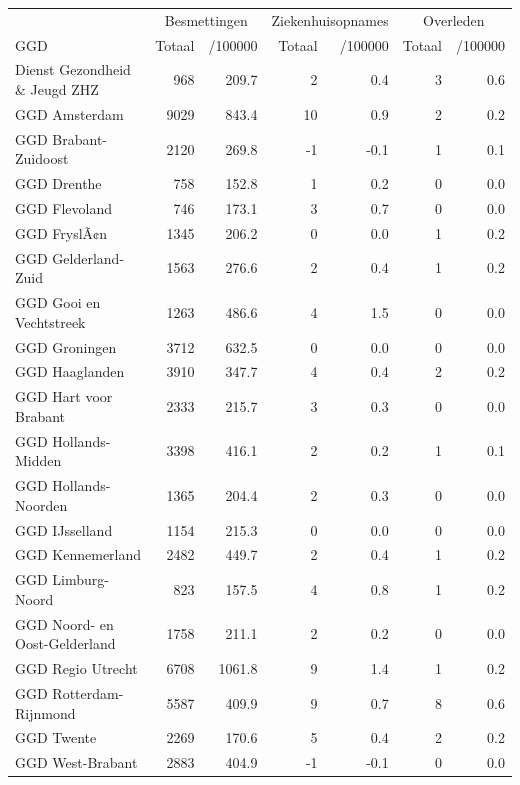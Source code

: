 \documentclass[
  english,
  man,floatsintext]{apa6}
\begin{document}
\begin{table}
\centering\begingroup\fontsize{10}{12}\selectfont

\begin{threeparttable}
\begin{tabular}{lrrrrrr}
\toprule
\multicolumn{1}{c}{ } & \multicolumn{2}{c}{Besmettingen} & \multicolumn{2}{c}{Ziekenhuisopnames} & \multicolumn{2}{c}{Overleden} \\
\cmidrule(l{3pt}r{3pt}){2-3} \cmidrule(l{3pt}r{3pt}){4-5} \cmidrule(l{3pt}r{3pt}){6-7}
GGD & Totaal & /100000 & Totaal & /100000 & Totaal & /100000\\
\midrule
Dienst Gezondheid \& Jeugd ZHZ & 968 & 209.7 & 2 & 0.4 & 3 & 0.6\\
GGD Amsterdam & 9029 & 843.4 & 10 & 0.9 & 2 & 0.2\\
GGD Brabant-Zuidoost & 2120 & 269.8 & -1 & -0.1 & 1 & 0.1\\
GGD Drenthe & 758 & 152.8 & 1 & 0.2 & 0 & 0.0\\
GGD Flevoland & 746 & 173.1 & 3 & 0.7 & 0 & 0.0\\
GGD FryslÃ¢n & 1345 & 206.2 & 0 & 0.0 & 1 & 0.2\\
GGD Gelderland-Zuid & 1563 & 276.6 & 2 & 0.4 & 1 & 0.2\\
GGD Gooi en Vechtstreek & 1263 & 486.6 & 4 & 1.5 & 0 & 0.0\\
GGD Groningen & 3712 & 632.5 & 0 & 0.0 & 0 & 0.0\\
GGD Haaglanden & 3910 & 347.7 & 4 & 0.4 & 2 & 0.2\\
GGD Hart voor Brabant & 2333 & 215.7 & 3 & 0.3 & 0 & 0.0\\
GGD Hollands-Midden & 3398 & 416.1 & 2 & 0.2 & 1 & 0.1\\
GGD Hollands-Noorden & 1365 & 204.4 & 2 & 0.3 & 0 & 0.0\\
GGD IJsselland & 1154 & 215.3 & 0 & 0.0 & 0 & 0.0\\
GGD Kennemerland & 2482 & 449.7 & 2 & 0.4 & 1 & 0.2\\
GGD Limburg-Noord & 823 & 157.5 & 4 & 0.8 & 1 & 0.2\\
GGD Noord- en Oost-Gelderland & 1758 & 211.1 & 2 & 0.2 & 0 & 0.0\\
GGD Regio Utrecht & 6708 & 1061.8 & 9 & 1.4 & 1 & 0.2\\
GGD Rotterdam-Rijnmond & 5587 & 409.9 & 9 & 0.7 & 8 & 0.6\\
GGD Twente & 2269 & 170.6 & 5 & 0.4 & 2 & 0.2\\
GGD West-Brabant & 2883 & 404.9 & -1 & -0.1 & 0 & 0.0\\

\end{tabular}
\end{threeparttable}
\end{table}
\end{document}
